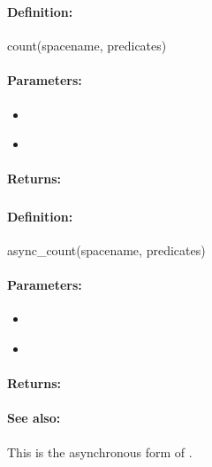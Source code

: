 \pagebreak
\subsubsection{}
\label{api:ruby:count}


\paragraph{Definition:}
\begin{rubycode}
count(spacename, predicates)
\end{rubycode}

\paragraph{Parameters:}
\begin{itemize}[noitemsep]
\item {}\\

\item {}\\

\end{itemize}

\paragraph{Returns:}


\pagebreak
\subsubsection{}
\label{api:ruby:async_count}


\paragraph{Definition:}
\begin{rubycode}
async_count(spacename, predicates)
\end{rubycode}

\paragraph{Parameters:}
\begin{itemize}[noitemsep]
\item {}\\

\item {}\\

\end{itemize}

\paragraph{Returns:}


\paragraph{See also:}  This is the asynchronous form of .
